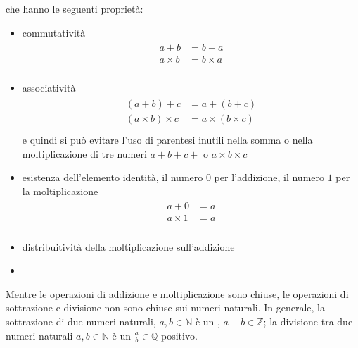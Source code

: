 \documentclass[letterpaper,10pt,italian]{jupyterBook}
\begin{document}
\sphinxAtStartPar
che hanno le seguenti proprietà:
\begin{itemize}
\item {} 
\sphinxAtStartPar
commutatività
\begin{equation*}
\begin{split}\begin{aligned}
    a + b & = b + a \\
    a \times b & = b \times a \\
  \end{aligned}\end{split}
\end{equation*}
\item {} 
\sphinxAtStartPar
associatività
\begin{equation*}
\begin{split}\begin{aligned}
    (a + b) + c & = a + (b+c) \\
    (a \times b) \times c & = a \times ( b \times c ) \\
  \end{aligned}\end{split}
\end{equation*}
\sphinxAtStartPar
e quindi si può evitare l’uso di parentesi inutili nella somma o nella moltiplicazione di tre numeri \(a+b+c+\) o \(a \times b \times c\)

\item {} 
\sphinxAtStartPar
esistenza dell’elemento identità, il numero \(0\) per l’addizione, il numero \(1\) per la moltiplicazione
\begin{equation*}
\begin{split}\begin{aligned}
    a + 0 & = a \\
    a \times 1 & = a \\
  \end{aligned}\end{split}
\end{equation*}
\item {} 
\sphinxAtStartPar
distribuitività della moltiplicazione sull’addizione

\item {} 
\sphinxAtStartPar
{}

\end{itemize}

\sphinxAtStartPar
Mentre le operazioni di addizione e moltiplicazione sono chiuse, le operazioni di sottrazione e divisione non sono chiuse sui numeri naturali. In generale, la sottrazione di due numeri naturali, \(a, b \in \mathbb{N}\) è un {\hyperref[\detokenize{ch/set/numeric-sets:sets-numeric-z}]{}}, \(a - b \in \mathbb{Z}\); la divisione tra due numeri naturali \(a, b \in \mathbb{N}\) è un {\hyperref[\detokenize{ch/set/numeric-sets:sets-numeric-q}]{}} \(\frac{a}{b} \in \mathbb{Q}\) positivo.
\end{document}
